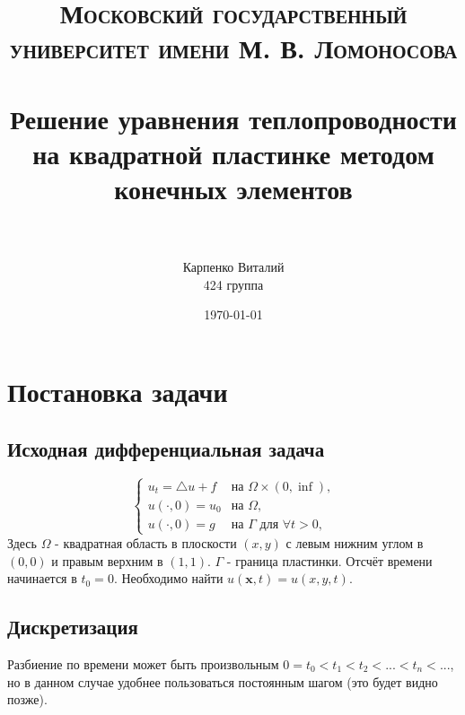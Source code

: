\documentclass[paper=a4, fontsize=11pt]{scrartcl} %
\title{
\normalfont \normalsize
\textsc{Московский государственный университет имени М. В. Ломоносова} \\ [25pt] %
\horrule{0.5pt} \\[0.4cm] %
\huge Решение уравнения теплопроводности на квадратной пластинке методом конечных элементов  \\ %
\horrule{2pt} \\[0.5cm] %
}
\author{Карпенко Виталий \\
424 группа} %
\date{\normalsize\today} %
\numberwithin{equation}{section} %
\numberwithin{figure}{section} %
\numberwithin{table}{section} %
\begin{document}
\maketitle %

\section{Постановка задачи}
\subsection{Исходная дифференциальная задача}
    \[
        \begin{cases}
            u_t = \bigtriangleup u + f& \text{на $\Omega \times (0, \inf)$,} \\
            u(\cdot, 0) = u_0& \text{на $\Omega$}, \\
            u(\cdot, 0) = g& \text{на $\Gamma$ для $\forall t > 0$,}
        \end{cases}
    \]
Здесь $\Omega$ - квадратная область в плоскости $(x, y)$ с левым нижним углом в $(0, 0)$ и правым верхним в $(1, 1)$.
$\Gamma$ - граница пластинки. Отсчёт времени начинается в $t_0 = 0$. Необходимо найти $u(\bm{x}, t) = u(x, y, t)$.
\subsection{Дискретизация}
Разбиение по времени может быть произвольным $0 = t_0 < t_1 < t_2 < ... < t_n < ...$, но в данном случае удобнее пользоваться постоянным шагом (это будет видно позже).
\end{document}
